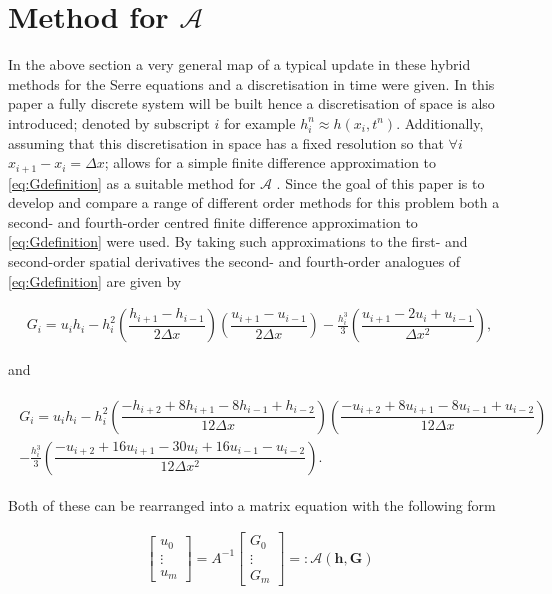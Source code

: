 \documentclass[SingleSpace,12pt]{Serre_ASCE}
\begin{document}
\section{Method for $\mathcal{A}$}
In the above section a very general map of a typical update in these hybrid methods for the Serre equations and a discretisation in time were given. In this paper a fully discrete system will be built hence a discretisation of space is also introduced; denoted by subscript $i$ for example $h^n_i \approx h(x_i , t^n)$. Additionally, assuming that this discretisation in space has a fixed resolution so that $\forall i$ $x_{i+1} - x_{i} = \Delta x$; allows for a simple finite difference approximation to \eqref{eq:Gdefinition} as a suitable method for $\mathcal{A}$ \cite{Hank-etal-2010-2034,Zoppou-2014}. Since the goal of this paper is to develop and compare a range of different order methods for this problem both a second- and fourth-order centred finite difference approximation to \eqref{eq:Gdefinition} were used. By taking such approximations to the first- and second-order spatial derivatives the second- and fourth-order analogues of \eqref{eq:Gdefinition} are given by
\begin{linenomath*}
\begin{gather}\label{eq:Gsecondord}
G_i = u_ih_i - h_i^2 \left(\dfrac{h_{i+1} - h_{i-1}}{2\Delta x}\right) \left(\dfrac{u_{i+1} - u_{i-1}}{2\Delta x}\right) - \frac{h_i^3}{3} \left(\dfrac{u_{i+1} - 2 u_{i} + u_{i-1}}{\Delta x^2}\right),
\end{gather}
\end{linenomath*}
and
\begin{linenomath*}
\begin{gather}
\begin{split}
G_i = u_ih_i - h_i^2 \left(\dfrac{-h_{i+2} + 8h_{i+1} - 8h_{i-1} + h_{i-2}}{12\Delta x}\right) \left(\dfrac{-u_{i+2} + 8u_{i+1} - 8u_{i-1} + u_{i-2}}{12\Delta x}\right) \\ - \frac{h_i^3}{3} \left(\dfrac{-u_{i+2} + 16u_{i+1} - 30u_{i} + 16u_{i-1} - u_{i-2}}{12\Delta x^2}\right).
\end{split}
\end{gather}
\label{eq:Gfourthord}
\end{linenomath*}
Both of these can be rearranged into a matrix equation with the following form 
\begin{linenomath*}
\begin{gather*}
\left[\begin{array}{c}
  u_0 \\
  \vdots \\
  u_m \end{array}\right] = A^{-1}
\left[\begin{array}{c}
 G_0 \\
 \vdots \\
 G_m \end{array}\right] =: \mathcal{A}(\boldsymbol{h},\boldsymbol{G})
\end{gather*}
\end{linenomath*}
\end{document}
